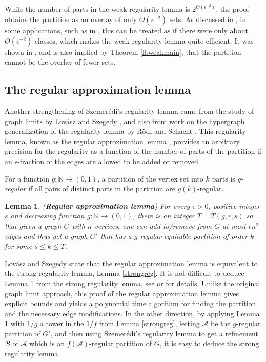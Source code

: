 \documentclass[11pt]{article}
\newtheorem{lemma}{Lemma}[section]
\begin{document}
While the number of parts in the weak regularity lemma is
$2^{\Theta(\epsilon^{-2})}$, the proof obtains the partition as an overlay of
only $O(\epsilon^{-2})$ sets. As discussed in \cite{LS}, in some applications,
such as in \cite{AFKK}, this can be treated as if there were only about
$O(\epsilon^{-2})$ classes, which makes the weak regularity lemma quite
efficient. It was shown in \cite{AFKK}, and is also implied by Theorem \ref{lbweakmain}, that the partition cannot be the overlay of fewer sets.

\subsection{The regular approximation lemma}\label{LSsubsection}

Another strengthening of Szemer\'edi's regularity lemma came from the study of
graph limits by Lov\'asz and Szegedy \cite{LS}, and also from work on the
hypergraph generalization of the regularity lemma by R\"odl and Schacht
\cite{RS07}. This regularity lemma, known as the regular approximation lemma
\cite{RoSc}, provides an arbitrary precision for the regularity as a function
of the number of parts of the partition if an $\epsilon$-fraction of the edges
are allowed to be added or removed.

For a function $g:\mathbb{N} \rightarrow (0,1)$, a partition of the vertex set
into $k$ parts is {\it $g$-regular} if all pairs of distinct parts in the
partition are $g(k)$-regular.

\begin{lemma}\label{LSlem} ({\bf Regular approximation lemma})
For every $\epsilon > 0$, positive integer $s$ and decreasing function $g : \mathbb{N} \rightarrow
(0,1)$, there is an integer $T = T(g,\epsilon,s)$ so that given a graph $G$ with
$n$ vertices, one can add-to/remove-from $G$ at most $\epsilon n^2$ edges and
thus get a graph $G'$ that has a $g$-regular equitable partition of order $k$ for some $s \leq k
\leq T$.
\end{lemma}

Lov\'asz and Szegedy \cite{LS} state that the regular approximation lemma is
equivalent to the strong regularity lemma, Lemma \ref{strongreg}. It is not
difficult to deduce Lemma \ref{LSlem} from the strong regularity lemma, see
\cite{AlShSt} or \cite{RoSc} for details. Unlike the original graph limit
approach, this proof of the regular approximation lemma gives explicit bounds
and yields a polynomial time algorithm for finding the partition and the
necessary edge modifications. In the other direction, by applying Lemma
\ref{LSlem} with $1/g$ a tower in the $1/f$ from Lemma \ref{strongreg}, letting
$\mathcal{A}$ be the $g$-regular partition of $G'$, and then using
Szemer\'edi's regularity lemma to get a refinement $\mathcal{B}$ of
$\mathcal{A}$ which is an $f(\mathcal{A})$-regular partition of $G$, it is easy to deduce
the strong regularity lemma.
\end{document}
